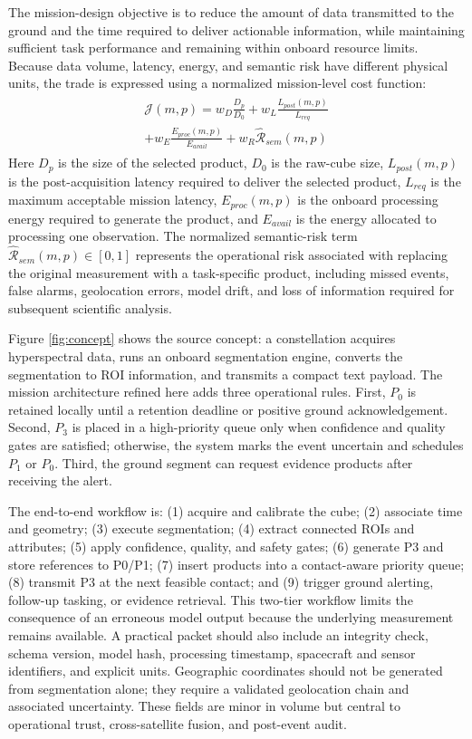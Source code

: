 \documentclass{iac}
\begin{document}
The mission-design objective is to reduce the amount of data transmitted to the ground and the time required to deliver actionable information, while maintaining sufficient task performance and remaining within onboard resource limits. Because data volume, latency, energy, and semantic risk have different physical units, the trade is expressed using a normalized mission-level cost function:
\begin{eqnarray}\label{eq:costfunc}
\begin{aligned}
	\mathcal{J}(m,p) = w_D \frac{D_p}{D_0} + w_L \frac{L_{post}(m,p)}{L_{req}} \\+ w_E \frac{E_{proc}(m,p)}{E_{avail}} + w_R \mathcal{\hat{R}}_{sem}(m,p)
\end{aligned}
\end{eqnarray}
Here \(D_p\) is the size of the selected product, \(D_0\) is the raw-cube size, \(L_{post}(m,p)\) is the post-acquisition latency required to deliver the selected product, \(L_{req}\) is the maximum acceptable mission latency, \(E_{proc}(m,p)\) is the onboard processing energy required to generate the product, and \(E_{avail}\) is the energy allocated to processing one observation. The normalized semantic-risk term \(\mathcal{\hat{R}}_{sem}(m,p) \in [0,1]\) represents the operational risk associated with replacing the original measurement with a task-specific product, including missed events, false alarms, geolocation errors, model drift, and loss of information required for subsequent scientific analysis.

Figure \ref{fig:concept} shows the source concept: a constellation acquires hyperspectral data, runs an onboard segmentation engine, converts the segmentation to ROI information, and transmits a compact text payload. The mission architecture refined here adds three operational rules. First, \(P_0\) is retained locally until a retention deadline or positive ground acknowledgement. Second, \(P_3\) is placed in a high-priority queue only when confidence and quality gates are satisfied; otherwise, the system marks the event uncertain and schedules \(P_1\) or \(P_0\). Third, the ground segment can request evidence products after receiving the alert.

The end-to-end workflow is: (1) acquire and calibrate the cube; (2) associate time and geometry; (3) execute segmentation; (4) extract connected ROIs and attributes; (5) apply confidence, quality, and safety gates; (6) generate P3 and store references to P0/P1; (7) insert products into a contact-aware priority queue; (8) transmit P3 at the next feasible contact; and (9) trigger ground alerting, follow-up tasking, or evidence retrieval. This two-tier workflow limits the consequence of an erroneous model output because the underlying measurement remains available.
A practical packet should also include an integrity check, schema version, model hash, processing timestamp, spacecraft and sensor identifiers, and explicit units. Geographic coordinates should not be generated from segmentation alone; they require a validated geolocation chain and associated uncertainty. These fields are minor in volume but central to operational trust, cross-satellite fusion, and post-event audit.
\end{document}
